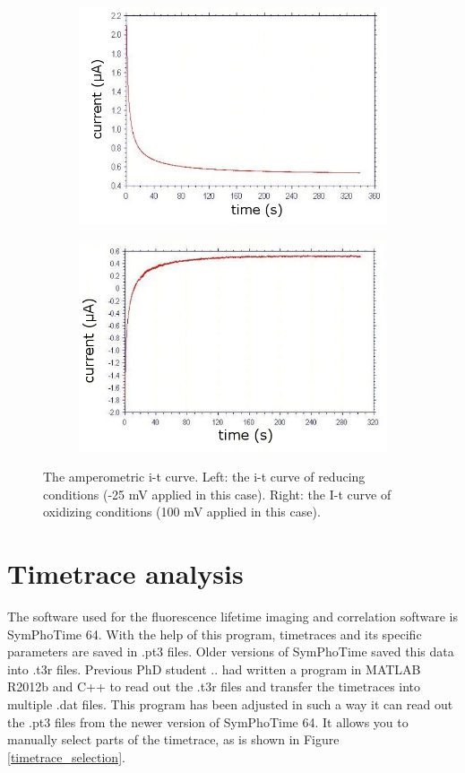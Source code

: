\documentclass[twoside,single]{lion-msc}
\begin{document}
\begin{figure}[ht!]
\begin{subfigure}{.5\textwidth}
  \centering
  \includegraphics[width= \textwidth]{it25mV}

  \label{}
\end{subfigure}%
\begin{subfigure}{.5\textwidth}
  \centering
  \includegraphics[width=.95 \linewidth]{it100mV}
  \label{}
\end{subfigure}
\caption{The amperometric i-t curve.  Left: the i-t curve of reducing conditions (-25 mV applied in this case). Right: the I-t curve of oxidizing conditions (100 mV applied in this case).}
\label{it_curves}
\end{figure}


\section*{Timetrace analysis}
The software used for the fluorescence lifetime imaging and correlation software is SymPhoTime 64. With the help of this program, timetraces and its specific parameters are saved in .pt3 files. Older versions of SymPhoTime saved this data into .t3r files. Previous PhD student .. had written a program in MATLAB R2012b and C++ to read out the .t3r files and transfer the timetraces into multiple .dat files. This program has been adjusted in such a way it can read out the .pt3 files from the newer version of SymPhoTime 64. It allows you to manually select parts of the timetrace, as is shown in Figure \ref{timetrace_selection}.
\end{document}
